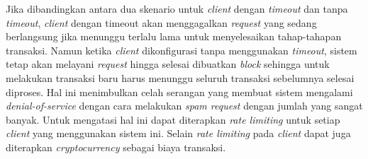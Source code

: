 Jika dibandingkan antara dua skenario untuk \textit{client} dengan \textit{timeout} dan tanpa \textit{timeout}, \textit{client} dengan timeout akan menggagalkan \textit{request} yang sedang berlangsung jika menunggu terlalu lama untuk menyelesaikan tahap-tahapan transaksi. Namun ketika \textit{client} dikonfigurasi tanpa menggunakan \textit{timeout}, sistem tetap akan melayani \textit{request} hingga selesai dibuatkan \textit{block} sehingga untuk melakukan transaksi baru harus menunggu seluruh transaksi sebelumnya selesai diproses. Hal ini menimbulkan celah serangan yang membuat sistem mengalami \textit{denial-of-service} dengan cara melakukan \textit{spam request} dengan jumlah yang sangat banyak. Untuk mengatasi hal ini dapat diterapkan \textit{rate limiting} untuk setiap \textit{client} yang menggunakan sistem ini. Selain \textit{rate limiting} pada \textit{client} dapat juga diterapkan \textit{cryptocurrency} sebagai biaya transaksi.



